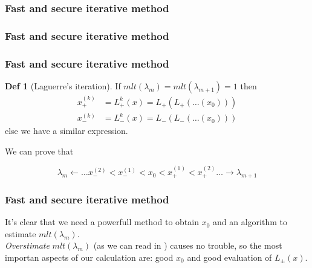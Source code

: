 \documentclass{beamer}
\newcommand{\R}{\mathbb{R}}
\theoremstyle{definition} \newtheorem{de}{Def}
\theoremstyle{remark} \newtheorem{os}[de]{Oss}
\theoremstyle{plain} \newtheorem{te}[de]{Teo}
\theoremstyle{plain} \newtheorem{co}[de]{Cor}
\theoremstyle{plain} \newtheorem{pr}[de]{Prop}
\theoremstyle{plain} \newtheorem{lem}[de]{Lemm}
\theoremstyle{remark} \newtheorem{rem}[de]{Remark}
\begin{document}
\begin{frame}
\frametitle{Fast and secure iterative method}


\end{frame}

\begin{frame}
\frametitle{Fast and secure iterative method}


\end{frame}



\begin{frame}
\frametitle{Fast and secure iterative method}

\begin{de}[Laguerre's iteration]
  If $mlt(\lambda_m)=mlt(\lambda_{m+1})=1$ then
  \begin{align*}
    x_{+}^{(k)} &= L_{+}^k(x)=L_{+}(L_{+}(\dots(x_{0})))\\
    x_{-}^{(k)} &= L_{-}^k(x)=L_{-}(L_{-}(\dots(x_{0})))
  \end{align*}
  else we have a similar expression.
\end{de} 

We can prove that

\begin{equation*}
  \lambda_m \leftarrow \dots x_{-}^{(2)} < x_{-}^{(1)} < x_{0} < x_{+}^{(1)} < x_{+}^{(2)} \dots \rightarrow \lambda_{m+1}
\end{equation*}
  
\end{frame}


\begin{frame}
\frametitle{Fast and secure iterative method}

It's clear that we need a powerfull method to obtain $x_{0}$ and an algorithm to 
estimate $mlt(\lambda_m)$. \\
\emph{Overstimate} $mlt(\lambda_m)$ (as we can read in \cite{MR1289159}) causes no trouble, so the most importan aspects of our calculation are: good $x_{0}$ and good evaluation of $L_{\pm}(x)$. 
\end{frame}
\end{document}
